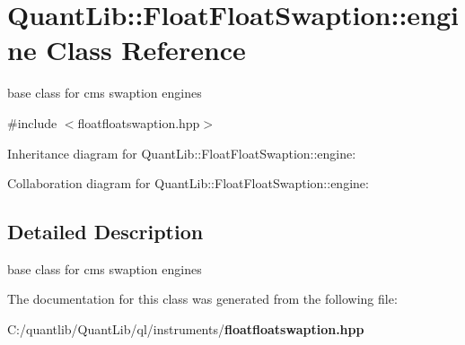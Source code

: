 \section{Quant\+Lib\+:\+:Float\+Float\+Swaption\+:\+:engine Class Reference}
\label{class_quant_lib_1_1_float_float_swaption_1_1engine}


base class for cms swaption engines  




{\ttfamily \#include $<$floatfloatswaption.\+hpp$>$}



Inheritance diagram for Quant\+Lib\+:\+:Float\+Float\+Swaption\+:\+:engine\+:


Collaboration diagram for Quant\+Lib\+:\+:Float\+Float\+Swaption\+:\+:engine\+:


\subsection{Detailed Description}
base class for cms swaption engines 

The documentation for this class was generated from the following file\+:\begin{DoxyCompactItemize}
\item 
C\+:/quantlib/\+Quant\+Lib/ql/instruments/{\bf floatfloatswaption.\+hpp}\end{DoxyCompactItemize}
